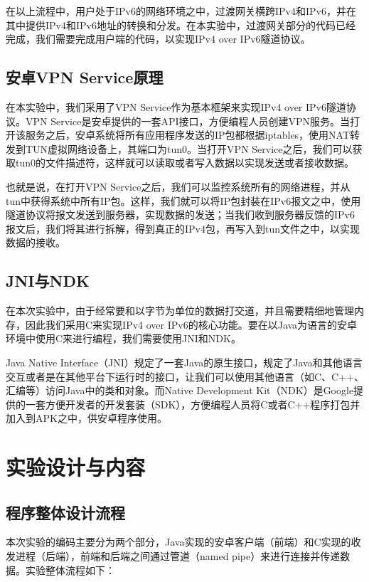 \documentclass[paper=a4, fontsize=11pt, UTF8]{article} %
\numberwithin{equation}{section} %
\numberwithin{figure}{section} %
\numberwithin{table}{section} %
\begin{document}
在以上流程中，用户处于IPv6的网络环境之中，过渡网关横跨IPv4和IPv6，并在其中提供IPv4和IPv6地址的转换和分发。在本实验中，过渡网关部分的代码已经完成，我们需要完成用户端的代码，以实现IPv4 over IPv6隧道协议。

\subsection{安卓VPN Service原理}

在本实验中，我们采用了VPN Service作为基本框架来实现IPv4 over IPv6隧道协议。VPN Service是安卓提供的一套API接口，方便编程人员创建VPN服务。当打开该服务之后，安卓系统将所有应用程序发送的IP包都根据iptables，使用NAT转发到TUN虚拟网络设备上，其端口为tun0。当打开VPN Service之后，我们可以获取tun0的文件描述符，这样就可以读取或者写入数据以实现发送或者接收数据。

也就是说，在打开VPN Service之后，我们可以监控系统所有的网络进程，并从tun中获得系统中所有IP包。这样，我们就可以将IP包封装在IPv6报文之中，使用隧道协议将报文发送到服务器，实现数据的发送；当我们收到服务器反馈的IPv6报文后，我们将其进行拆解，得到真正的IPv4包，再写入到tun文件之中，以实现数据的接收。

\subsection{JNI与NDK}

在本次实验中，由于经常要和以字节为单位的数据打交道，并且需要精细地管理内存，因此我们采用C来实现IPv4 over IPv6的核心功能。要在以Java为语言的安卓环境中使用C来进行编程，我们需要使用JNI和NDK。

Java Native Interface（JNI）规定了一套Java的原生接口，规定了Java和其他语言交互或者是在其他平台下运行时的接口，让我们可以使用其他语言（如C、C++、汇编等）访问Java中的类和对象。而Native Development Kit（NDK）是Google提供的一套方便开发者的开发套装（SDK），方便编程人员将C或者C++程序打包并加入到APK之中，供安卓程序使用。

\section{实验设计与内容}

\subsection{程序整体设计流程}

本次实验的编码主要分为两个部分，Java实现的安卓客户端（前端）和C实现的收发进程（后端），前端和后端之间通过管道（named pipe）来进行连接并传递数据。实验整体流程如下：
\end{document}
